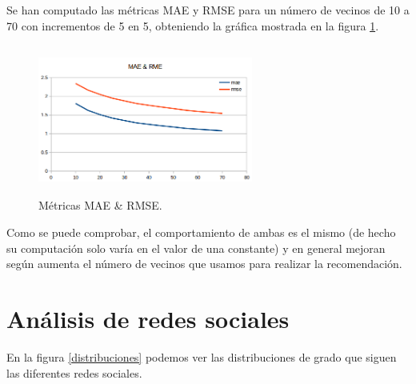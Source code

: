 \documentclass[spanish]{assignment}
\begin{document}
	Se han computado las métricas MAE y RMSE para un número de vecinos de 10 a 70 con incrementos de 5 en 5, obteniendo la gráfica mostrada en la figura \ref{mae_rmse}.
	
	\begin{figure}
		\centering
		\includegraphics[width=200pt, height=140pt]{img/mae_rmse.png}
		\caption{Métricas MAE \& RMSE.}
		\label{mae_rmse}
	\end{figure}
	
	Como se puede comprobar, el comportamiento de ambas es el mismo (de hecho su computación solo varía en el valor de una constante) y en general mejoran según aumenta el número de vecinos que usamos para realizar la recomendación.
	
	\section{Análisis de redes sociales}
	
	En la figura \ref{distribuciones} podemos ver las distribuciones de grado que siguen las diferentes redes sociales.
	
\end{document}

